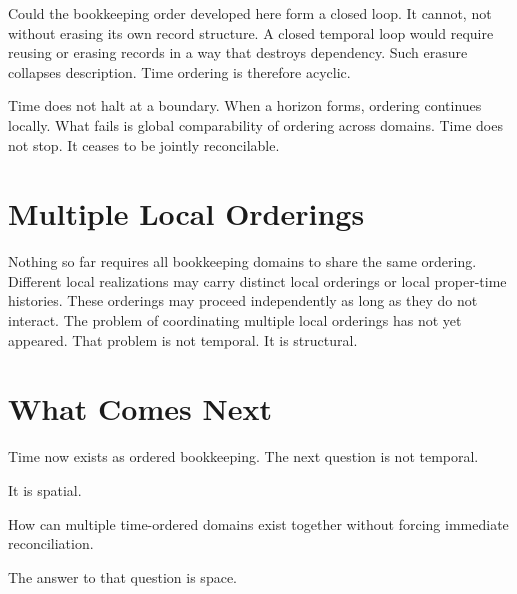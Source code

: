 \documentclass[11pt,twoside,openright]{book}
\begin{document}
Could the bookkeeping order developed here form a closed loop. It cannot, not without erasing its own record structure. A closed temporal loop would require reusing or erasing records in a way that destroys dependency. Such erasure collapses description. Time ordering is therefore acyclic.

Time does not halt at a boundary. When a horizon forms, ordering continues locally. What fails is global comparability of ordering across domains. Time does not stop. It ceases to be jointly reconcilable.

\section*{Multiple Local Orderings}

Nothing so far requires all bookkeeping domains to share the same ordering. Different local realizations may carry distinct local orderings or local proper-time histories. These orderings may proceed independently as long as they do not interact. The problem of coordinating multiple local orderings has not yet appeared. That problem is not temporal. It is structural.

\section*{What Comes Next}

Time now exists as ordered bookkeeping. The next question is not temporal.

It is spatial.

How can multiple time-ordered domains exist together without forcing immediate reconciliation.

The answer to that question is space.
\end{document}
